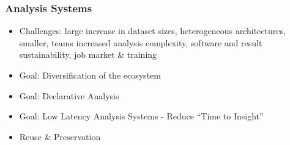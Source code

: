 \begin{frame}
\frametitle{Analysis Systems}

\begin{itemize}
\item Challenges: large increase in dataset sizes, heterogeneous architectures, smaller, teams increased analysis complexity, software and result sustainability, job market \& training
\item Goal: Diversification of the ecosystem
\item Goal: Declarative Analysis
\item Goal: Low Latency Analysis Systems - Reduce ``Time to Insight''
\item Reuse \& Preservation
\end{itemize}

\end{frame}


